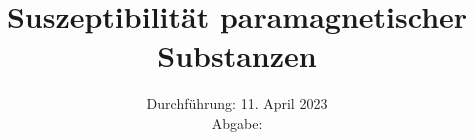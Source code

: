 

\subject{\texorpdfstring{\vspace{2ex}}{}V606\texorpdfstring{\vspace{-2ex}}{}} %
\title{Suszeptibilität paramagnetischer Substanzen} %
\date{
	Durchführung: 11. April 2023 %
	\\ Abgabe:%
}




\maketitle
\thispagestyle{empty}


\tableofcontents
\newpage







\printbibliography{}

\newpage



